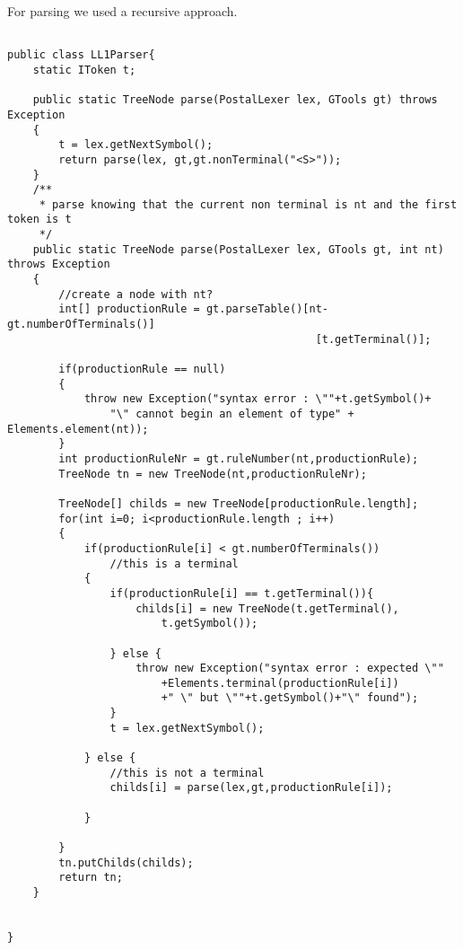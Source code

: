 \documentclass{eplDoc}
\begin{document}
For parsing we used a recursive approach.
\begin{lstlisting}
    
public class LL1Parser{
	static IToken t;

	public static TreeNode parse(PostalLexer lex, GTools gt) throws Exception
	{ 
		t = lex.getNextSymbol();
		return parse(lex, gt,gt.nonTerminal("<S>"));
	}
	/**
	 * parse knowing that the current non terminal is nt and the first token is t
	 */
	public static TreeNode parse(PostalLexer lex, GTools gt, int nt) throws Exception
	{ 
		//create a node with nt?
		int[] productionRule = gt.parseTable()[nt-gt.numberOfTerminals()]
                                                [t.getTerminal()];
		
		if(productionRule == null)
		{
			throw new Exception("syntax error : \""+t.getSymbol()+
                "\" cannot begin an element of type" + Elements.element(nt));
		}
		int productionRuleNr = gt.ruleNumber(nt,productionRule);
		TreeNode tn = new TreeNode(nt,productionRuleNr);
		
		TreeNode[] childs = new TreeNode[productionRule.length];
		for(int i=0; i<productionRule.length ; i++)
		{
			if(productionRule[i] < gt.numberOfTerminals())
				//this is a terminal
			{
				if(productionRule[i] == t.getTerminal()){
					childs[i] = new TreeNode(t.getTerminal(),
                        t.getSymbol());

				} else {
					throw new Exception("syntax error : expected \""
                        +Elements.terminal(productionRule[i]) 
                        +" \" but \""+t.getSymbol()+"\" found");
				}
				t = lex.getNextSymbol();

			} else {
				//this is not a terminal
				childs[i] = parse(lex,gt,productionRule[i]);
				
			}
			
		}
		tn.putChilds(childs);
		return tn;
	}
	
    
}
\end{lstlisting}
\end{document}
